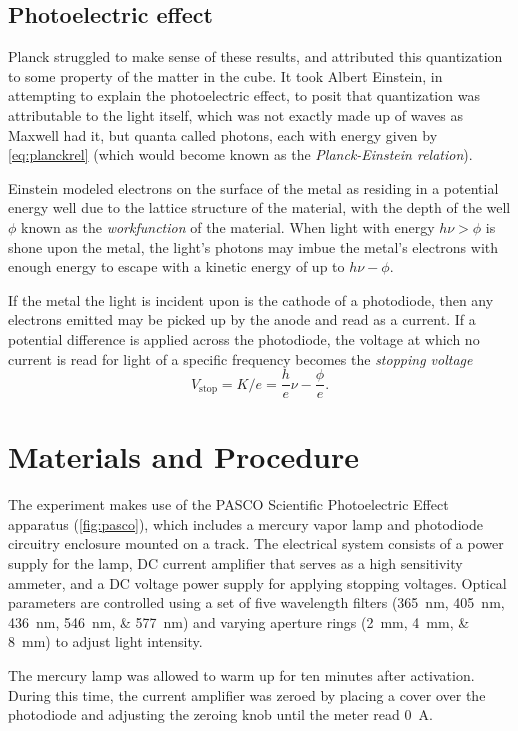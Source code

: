 \documentclass{article}
\begin{document}
\subsection{Photoelectric effect}
Planck struggled to make sense of these results, and attributed this quantization to some property of the matter in the cube. It took Albert Einstein, in attempting to explain the photoelectric effect, to posit that quantization was attributable to the light itself, which was not exactly made up of waves as Maxwell had it, but quanta called photons, each with energy given by \autoref{eq:planckrel} (which would become known as the \emph{Planck-Einstein relation}).

Einstein modeled electrons on the surface of the metal as residing in a potential energy well due to the lattice structure of the material, with the depth of the well $\phi$ known as the \emph{workfunction} of the material. When light with energy $h\nu > \phi$ is shone upon the metal, the light's photons may imbue the metal's electrons with enough energy to escape with a kinetic energy of up to $h\nu - \phi$.

If the metal the light is incident upon is the cathode of a photodiode, then any electrons emitted may be picked up by the anode and read as a current. If a potential difference is applied across the photodiode, the voltage at which no current is read for light of a specific frequency becomes the \emph{stopping voltage}
\begin{equation}
    V_\text{stop} = K/e = \frac{h}{e}\nu - \frac{\phi}{e}.
    \label{eq:vstop}
\end{equation}

\section{Materials and Procedure}
The experiment makes use of the PASCO Scientific Photoelectric Effect apparatus (\autoref{fig:pasco}), which includes a mercury vapor lamp and photodiode circuitry enclosure mounted on a track. The electrical system consists of a power supply for the lamp, DC current amplifier that serves as a high sensitivity ammeter, and a DC voltage power supply for applying stopping voltages. Optical parameters are controlled using a set of five wavelength filters (\qtylist{365;405;436;546;577}{nm}) and varying aperture rings (\qtylist{2;4;8}{mm}) to adjust light intensity. 

The mercury lamp was allowed to warm up for ten minutes after activation. During this time, the current amplifier was zeroed by placing a cover over the photodiode and adjusting the zeroing knob until the meter read \qty{0}{A}.
\end{document}
